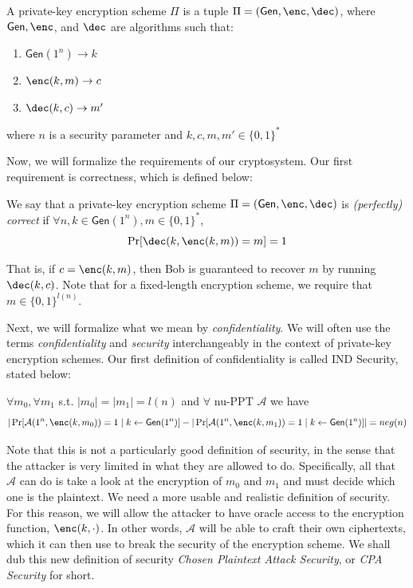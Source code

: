 \documentclass[12pt]{tufte-book}
\newcommand{\ma}{\mathcal{A}}
\newcommand{\bit}{\{0,1\}}
\newcommand{\gen}{\mathsf{Gen}}
\begin{document}
\begin{definition}
    A private-key encryption scheme $\Pi$ is a tuple $\Pi = (\gen, \enc, \dec)$, where $\gen, \enc$, and $\dec$ are algorithms such that:
    \begin{enumerate}
        \item $\gen(1^n) \rightarrow k$
        \item $\enc(k, m) \rightarrow c$
        \item $\dec(k, c) \rightarrow m'$
    \end{enumerate}

    where $n$ is a security parameter and $k, c, m, m' \in \{0, 1\}^*$
\end{definition}

Now, we will formalize the requirements of our cryptosystem.
Our first requirement is correctness, which is defined below:

\begin{definition}
    We say that a private-key encryption scheme $\Pi = (\gen, \enc, \dec)$ is \emph{(perfectly) correct} if 
    $\forall n, k \in \gen(1^n), m \in \{0,1\}^{*}$,
    $$\Pr[\dec(k,\enc(k,m)) = m] = 1$$
\end{definition}
That is, if $c = \enc(k, m)$, then Bob is guaranteed to recover $m$ by running $\dec(k, c)$. Note that for a fixed-length encryption scheme, we require that $m \in \bit^{l(n)}$.

Next, we will formalize what we mean by \textit{confidentiality}.
We will often use the terms \textit{confidentiality} and \textit{security} interchangeably in the context of private-key encryption schemes.
Our first definition of confidentiality is called IND Security, stated below:

\begin{definition}
    $\forall m_0, \forall m_1$ s.t. $|m_0| = |m_1|= l(n)$ and $\forall$ nu-PPT $\ma$ we have
    $$|\Pr[\ma(1^n, \enc(k, m_0)) = 1 \; | \; k \leftarrow \gen(1^n)] - |\Pr[\ma(1^n, \enc(k, m_1)) = 1 \; | \; k \leftarrow \gen(1^n)]| = neg(n)$$ 
\end{definition}
Note that this is not a particularly good definition of security, in the sense that the attacker is very limited in what they are allowed to do.
Specifically, all that $\ma$ can do is take a look at the encryption of $m_0$ and $m_1$ and must decide which one is the plaintext.
We need a more usable and realistic definition of security.
For this reason, we will allow the attacker to have oracle access to the encryption function, $\enc(k, \cdot)$.
In other words, $\ma$ will be able to craft their own ciphertexts, which it can then use to break the security of the encryption scheme.
We shall dub this new definition of security \textit{Chosen Plaintext Attack Security}, or \textit{CPA Security} for short.
\end{document}
